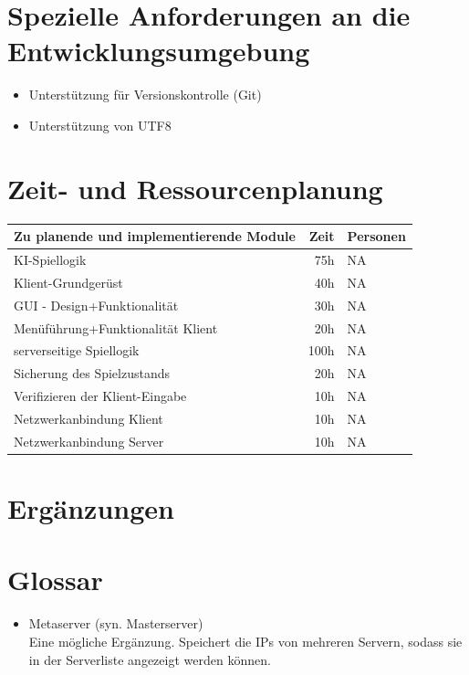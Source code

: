 \documentclass[a4paper,10pt]{article}
\begin{document}
\section{Spezielle Anforderungen an die Entwicklungsumgebung}
\begin{itemize}
\item Unterstützung für Versionskontrolle (Git)
\item Unterstützung von UTF8
\end{itemize}
\section{Zeit- und Ressourcenplanung}
\begin{tabular}[h]{l | r | l}
  \hline
  Zu planende und implementierende Module & Zeit & Personen\\
  \hline
  \hline
  KI-Spiellogik & 75h & NA\\
  Klient-Grundgerüst & 40h & NA\\
  GUI - Design+Funktionalität & 30h & NA\\
  Menüführung+Funktionalität Klient & 20h & NA\\
  serverseitige Spiellogik & 100h & NA\\
  Sicherung des Spielzustands & 20h & NA\\
  Verifizieren der Klient-Eingabe & 10h & NA\\
  Netzwerkanbindung Klient & 10h & NA\\
  Netzwerkanbindung Server & 10h & NA\\
  \hline
\end{tabular}
\section{Ergänzungen}
\section{Glossar}
\begin{itemize}
\item Metaserver (syn. Masterserver) \\
Eine mögliche Ergänzung. Speichert die IPs von mehreren Servern, sodass sie in der Serverliste angezeigt werden können.
\end{itemize}
\end{document}
